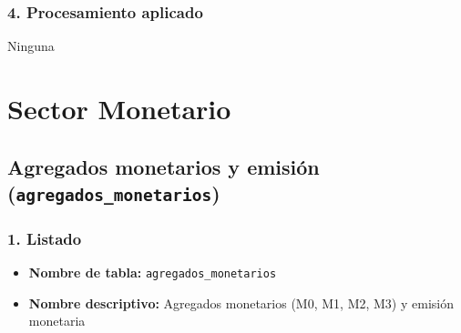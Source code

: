 \documentclass[12pt,a4paper]{article}
\begin{document}
\subsubsection*{4. Procesamiento aplicado}
Ninguna

\section{Sector Monetario}

\subsection{Agregados monetarios y emisión \small(\texttt{agregados\_monetarios})}

\subsubsection*{1. Listado}
\begin{itemize}
  \item \textbf{Nombre de tabla:} \texttt{agregados\_monetarios}
  \item \textbf{Nombre descriptivo:} Agregados monetarios (M0, M1, M2, M3) y emisión monetaria
\end{itemize}
\end{document}
